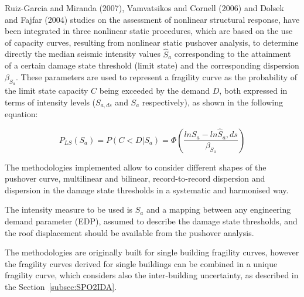 Ruiz-Garcia and Miranda (2007), Vamvatsikos and Cornell (2006) and Dolsek and Fajfar (2004) studies on the assessment of nonlinear structural response, have been integrated in three nonlinear static procedures, which are based on the use of capacity curves, resulting from nonlinear static pushover analysis, to determine directly the median seismic intensity values $\hat{S}_a$ corresponding to the attainment of a certain damage state threshold (limit state) and the corresponding dispersion $\beta_{S_a}$. These parameters are used to represent a fragility curve as the probability of the limit state capacity $C$ being exceeded by the demand $D$, both expressed in terms of intensity levels ($S_{a,ds}$ and $S_a$ respectively), as shown in the following equation:

\begin{equation}
P_{LS}(S_a) = P(C < D | S_a) = \Phi(\frac{ln S_a -ln \hat{S}_a, ds}{\beta_{S_a}})
\label{eq:fragility-definition}
\end{equation}

The methodologies implemented allow to consider different shapes of the pushover curve, multilinear and bilinear, record-to-record dispersion and dispersion in the damage state thresholds in a systematic and harmonised way.

The intensity measure to be used is $S_a$ and a mapping between any engineering demand parameter (EDP), assumed to describe the damage state thresholds, and the roof displacement should be available from the pushover analysis.

The methodologies are originally built for single building fragility curves, however the fragility curves derived for single buildings can be combined in a unique fragility curve, which considers also the inter-building uncertainty, as described in the Section~\ref{subsec:SPO2IDA}.